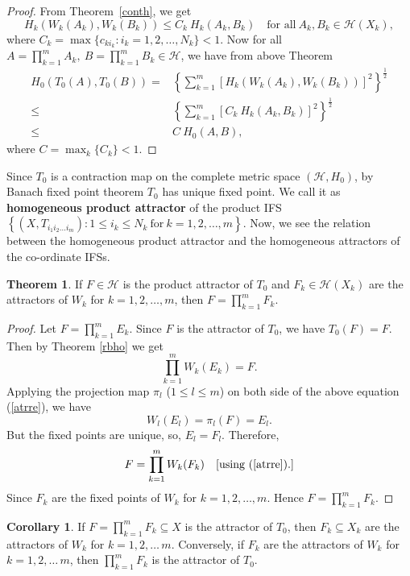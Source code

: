 \documentclass[10pt]{amsart}
\theoremstyle{definition}
\newtheorem{thm}{Theorem}[section]
\newtheorem{cor}{Corollary}[section]
\begin{document}
	\begin{proof}
		From Theorem~\ref{conth}, we get $$H_k\left(W_k(A_k),W_k(B_k)\right)\leq C_k~H_k(A_k,B_k)\quad\mbox{for all}~A_k,B_k\in\mathscr{H}(X_k),$$ where $C_k=\max\{c_{ki_k}:i_k=1,2,\ldots,N_k\}<1.$ Now for all $A=\prod_{k=1}^mA_k,~B=\prod_{k=1}^mB_k\in \mathscr{H}$, we have from above Theorem
		\begin{align*}
			H_0(T_0(A),T_0(B))=&\left\{\sum_{k=1}^{m}\left[H_k(W_k(A_k),W_k(B_k))\right]^2\right\}^\frac{1}{2}\\
			\leq&\left\{\sum_{k=1}^{m}\left[C_k~H_k(A_k,B_k)\right]^2\right\}^\frac{1}{2}\\
			\leq&C~H_0(A,B),
		\end{align*}
		where $C=\max_{k}\{C_k\}<1$.
	\end{proof}
	Since $T_0$ is a contraction map on the complete metric space $(\mathscr{H},H_0)$, by Banach fixed point theorem  $T_0$ has unique fixed point. We call it as \textbf{homogeneous product attractor} of the product IFS $\left\{(X,T_{i_1i_2\ldots i_m}):1\leq i_k\leq N_k~\mbox{for}~k=1,2,\ldots,m\right\}$. Now, we see the relation between the homogeneous product attractor and the homogeneous attractors of the co-ordinate IFSs.
	\begin{thm}
		If $F\in\mathscr{H}$ is the product attractor of $T_0$ and $F_k\in\mathscr{H}(X_k)$ are the attractors of $W_k$ for $k=1,2,\ldots,m$, then $F=\prod_{k=1}^{m}F_k.$
		\label{rbtaoifs}
	\end{thm}
	\begin{proof}
		Let $F=\prod_{k=1}^mE_k$.
		Since $F$ is the attractor of $T_0$, we have  $T_0(F)=F$. Then by Theorem \ref{rbho} we get
		\begin{equation}
			\prod_{k=1}^{m}W_k(E_k)=F.
			\label{atrre}
		\end{equation}
		Applying the projection map $\pi_l$ ($1\leq l\leq m$) on both side of the above equation (\ref{atrre}), we have $$W_l(E_l)=\pi_l(F)=E_l.$$
		But the fixed points are unique, so, $E_l=F_l.$ Therefore,
		$$F=\prod_{k=1}^{m}W_k(F_k)\quad [\mbox{using (\ref{atrre})}.]$$
		Since $F_k$ are the fixed points of $W_k$ for $k=1,2,\ldots,m.$ Hence $F=\prod_{k=1}^mF_k.$
	\end{proof}
	\begin{cor}
		If  $F=\prod_{k=1}^mF_k\subseteq X$ is the attractor of $T_0$, then $F_k\subseteq X_k$ are the attractors of $W_k$ for $k=1,2,\ldots\,m.$ Conversely, if $F_k$ are the attractors of $W_k$ for $k=1,2,\ldots\,m$, then $\prod_{k=1}^mF_k$ is the attractor of $T_0$.
		\label{corat}
	\end{cor}
\end{document}
